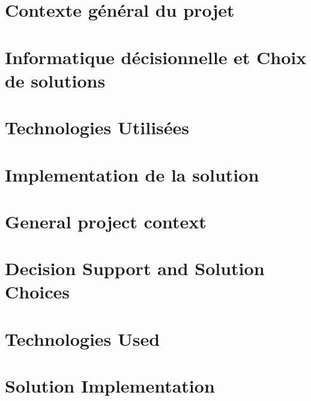 \documentclass{iid}
\begin{document}


\setcounter{page}{1}
\ifnum{}
    
\else
    
\fi
\ifnum{}
\else
\fi
\fancyhead[L]{\tiny \leftmark}
\fancyhead[R]{\scriptsize \rightmark}
\fancyfoot[C]{\thepage}


\ifnum{}
    \chapter{Contexte général du projet}\label{chap:1}
    \minitoc
    
    \chapter{Informatique décisionnelle et Choix de solutions}\label{chap:2}
    

    \chapter{Technologies Utilisées}\label{chap:3}
    

    \chapter{Implementation de la solution}\label{chap:4}
    

\else
    \chapter{General project context}\label{chap:1}
    

    \chapter{Decision Support and Solution Choices}\label{chap:2}
    

    \chapter{Technologies Used}\label{chap:3}
    

    \chapter{Solution Implementation}\label{chap:4}
    
\fi
 
% 
\ifnum{}
    
\else
    
\fi
% 
\lhead[]{} \rhead[]{} \chead[]{}




%
\end{document}
